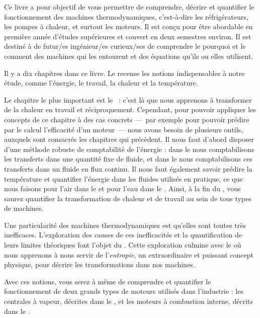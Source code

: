 Ce livre a pour objectif de vous permettre de comprendre, décrire et quantifier le fonctionnement des machines thermodynamiques, c’est-à-dire les réfrigérateurs, les pompes à chaleur, et surtout les moteurs. Il est conçu pour être abordable en première année d’études supérieures et couvert en deux semestres environ. Il est destiné à de futur/es ingénieur/es curieux/ses de comprendre le pourquoi et le comment des machines qui les entourent et des équations qu’ils ou elles utilisent.

Il y a dix chapitres dans ce livre. Le \coursun recense les notions indispensables à notre étude, comme l’énergie, le travail, la chaleur et la température.

Le chapitre le plus important est le \courssix~: c’est là que nous apprenons à transformer de la chaleur en travail et réciproquement. Cependant, pour pouvoir appliquer les concepts de ce chapitre à des cas concrets —~par exemple pour pouvoir prédire par le calcul l’efficacité d’un moteur~— nous avons besoin de plusieurs outils, auxquels sont consacrés les chapitres qui précèdent. Il nous faut d’abord disposer d’une méthode robuste de comptabilité de l’énergie : dans le \coursdeux nous comptabilisons les transferts dans une quantité fixe de fluide, et dans le \courstrois nous comptabilisons ces transferts dans un fluide en flux continu. Il nous faut également savoir prédire la température et quantifier l’énergie dans les fluides utilisés en pratique, ce que nous faisons pour l’air dans le \coursquatre et pour l’eau dans le \courscinq. Ainsi, à la fin du \courssixshort, vous saurez quantifier la transformation de chaleur et de travail au sein de tous types de machines.

Une particularité des machines thermodynamiques est qu’elles sont toutes très inefficaces. L’exploration des causes de ces inefficacités et la quantification de leurs limites théoriques font l’objet du \courssept. Cette exploration culmine avec le \courshuitshort où nous apprenons à nous servir de l’\textit{entropie}, un extraordinaire et puissant concept physique, pour décrire les transformations dans nos machines.

Avec ces notions, vous serez à même de comprendre et quantifier le fonctionnement de deux grands types de moteurs utilisés dans l’industrie : les centrales à vapeur, décrites dans le \coursneuf, et les moteurs à combustion interne, décrits dans le \coursdix.

\onlyamphibook{\clearpage\thispagestyle{empty}}%
\begin{center}
\end{center}

